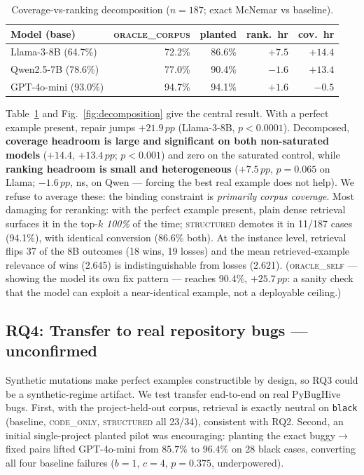 \documentclass[10pt,conference,a4paper]{IEEEtran}
\newcommand{\structured}{\textsc{structured}\xspace}
\newcommand{\codeonly}{\textsc{code\_only}\xspace}
\newcommand{\oraclecorpus}{\textsc{oracle\_corpus}\xspace}
\newcommand{\pp}{\,pp}
\begin{document}
\begin{table}[t]
\caption{Coverage-vs-ranking decomposition ($n{=}187$; exact McNemar vs
baseline).}
\label{tab:decomposition}
\centering
\begin{tabular}{lrrrr}
\toprule
Model (base) & \oraclecorpus & planted & rank.\ hr & cov.\ hr \\
\midrule
Llama-3-8B (64.7\%) & 72.2\% & 86.6\% & $+7.5$ & $\mathbf{+14.4}$ \\
Qwen2.5-7B (78.6\%) & 77.0\% & 90.4\% & $-1.6$ & $\mathbf{+13.4}$ \\
GPT-4o-mini (93.0\%) & 94.7\% & 94.1\% & $+1.6$ & $-0.5$ \\
\bottomrule
\end{tabular}
\end{table}

Table~\ref{tab:decomposition} and Fig.~\ref{fig:decomposition} give the
central result. With a perfect example present, repair jumps $+21.9\pp$
(Llama-3-8B, $p{<}0.0001$). Decomposed, \textbf{coverage headroom is large
and significant on both non-saturated models} ($+14.4$, $+13.4\pp$;
$p{<}0.001$) and zero on the saturated control, while \textbf{ranking
headroom is small and heterogeneous} ($+7.5\pp$, $p{=}0.065$ on Llama;
$-1.6\pp$, ns, on Qwen --- forcing the best real example does not help). We
refuse to average these: the binding constraint is \emph{primarily corpus
coverage}. Most damaging for reranking: with the perfect example present,
plain dense retrieval surfaces it in the top-$k$ \emph{100\%} of the time;
\structured demotes it in 11/187 cases (94.1\%), with identical conversion
(86.6\% both). At the instance level, retrieval flips 37 of the 8B outcomes
(18 wins, 19 losses) and the mean retrieved-example relevance of wins
(2.645) is indistinguishable from losses (2.621). (\textsc{oracle\_self} ---
showing the model its own fix pattern --- reaches 90.4\%, $+25.7\pp$: a
sanity check that the model can exploit a near-identical example, not a
deployable ceiling.)

\subsection{RQ4: Transfer to real repository bugs --- unconfirmed}
\label{sec:results-transfer}

Synthetic mutations make perfect examples constructible by design, so RQ3
could be a synthetic-regime artifact. We test transfer end-to-end on real
PyBugHive bugs. First, with the project-held-out corpus, retrieval is
exactly neutral on \texttt{black} (baseline, \codeonly, \structured all
23/34), consistent with RQ2. Second, an initial single-project planted
pilot was encouraging: planting the exact buggy$\to$fixed pairs lifted
GPT-4o-mini from $85.7\%$ to $96.4\%$ on 28 black cases, converting all
four baseline failures ($b{=}1$, $c{=}4$, $p{=}0.375$, underpowered).
\end{document}
